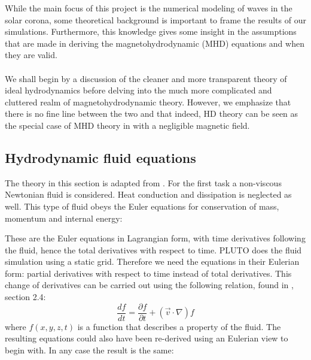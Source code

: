 While the main focus of this project is the numerical modeling of waves in the solar corona, some theoretical background is important to frame the results of our simulations.
Furthermore, this knowledge gives some insight in the assumptions that are made in deriving the magnetohydrodynamic (MHD) equations and when they are valid. \\
\\
We shall begin by a discussion of the cleaner and more transparent theory of ideal hydrodynamics before delving into the much more complicated and cluttered realm of magnetohydrodynamic theory. However, we emphasize that there is no fine line between the two and that indeed, HD theory can be seen as the special case of MHD theory in with a negligible magnetic field. 

\subsection{Hydrodynamic fluid equations}
The theory in this section is adapted from \cite{notes-fluid-dynamics}. For the first task a non-viscous Newtonian fluid is considered. Heat conduction and dissipation is neglected as well.
This type of fluid obeys the Euler equations for conservation of mass, momentum and internal energy:

{\centering
\noindent {}\par}


These are the Euler equations in Lagrangian form, with time derivatives following the fluid, hence the total derivatives with respect to time.
PLUTO does the fluid simulation using a static grid. Therefore we need the equations in their Eulerian form: partial derivatives with respect to time instead of total derivatives.
This change of derivatives can be carried out using the following relation, found in \cite{notes-fluid-dynamics}, section 2.4:
\begin{equation}
	\frac{df}{dt} = \frac{\partial f}{\partial t} + (\vec{v} \cdot \nabla) f
	\label{eq:relation-total-partial}
\end{equation}
where $f(x,y,z,t)$ is a function that describes a property of the fluid. The resulting equations could also have been re-derived using an Eulerian view to begin with. In any case the result is the same:

